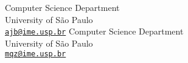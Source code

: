   \usepackage[figure,table]{hypcap}
\fi

\hypersetup{
    colorlinks,%
    citecolor=black,%
    filecolor=black,%
    linkcolor=black,%
    urlcolor=black
}

\title{\papertitle}

%

\twoauthors
  {\firstauthor} {Computer Science Department \\
                  University of São Paulo \\ %
    {\tt \href{mailto:ajb@ime.usp.br}{ajb@ime.usp.br}}}
  {\secondauthor} {Computer Science Department \\
                  University of São Paulo \\ %
    {\tt \href{mailto:mqz@ime.usp.br}{mqz@ime.usp.br}}}




%
\capstartfalse
\maketitle
\capstarttrue

%

\maketitle

